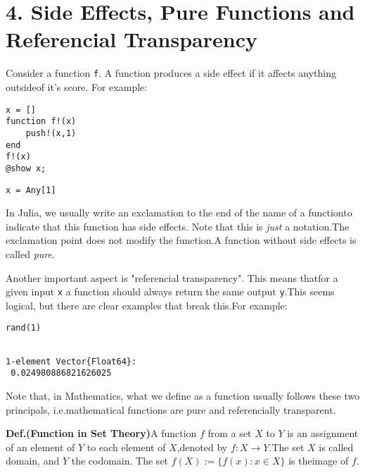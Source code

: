 \endgroup

\section{4. Side Effects, Pure Functions and Referencial Transparency}


Consider a function \lstinline[style=julia]{f}. A function produces a side effect if it affects anything outsideof it's score. For example:
\bigskip
\begin{lstlisting}[language=JuliaLocal, style=julia, texcl=true]
x = []
function f!(x)
    push!(x,1)
end
f!(x)
@show x;
\end{lstlisting}

\begingroup

\fontsize{10pt}{12pt}\selectfont

\begin{verbatim}
x = Any[1]

\end{verbatim}

\endgroup
In Julia, we usually write an exclamation to the end of the name of a functionto indicate that this function has side effects. Note that this is \textit{just} a notation.The exclamation point does not modify the function.A function without side effects is called \textit{pure}.

Another important aspect is "referencial transparency". This means thatfor a given input \lstinline[style=julia]{x} a function should always return the same output \lstinline[style=julia]{y}.This seems logical, but there are clear examples that break this.For example:
\bigskip
\begin{lstlisting}[language=JuliaLocal, style=julia, texcl=true]
rand(1)
\end{lstlisting}

\begingroup

\fontsize{10pt}{12pt}\selectfont

\begin{verbatim}

1-element Vector{Float64}:
 0.024980886821626025
\end{verbatim}

\endgroup
Note that, in Mathematics, what we define as a function usually follows these two principals, i.e.mathematical functions are pure and referencially transparent.

\textbf{Def.(Function in Set Theory)}A function $f$ from a set $X$ to $Y$ is an assignment of an element of $Y$ to each element of $X$,denoted by $f: X \to Y$.The set $X$ is called domain, and $Y$ the codomain. The set $f(X):=\{f(x) :  x \in X\}$ is theimage of $f$.

